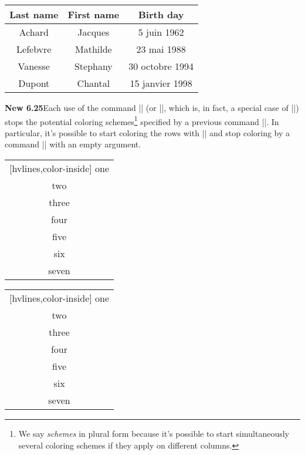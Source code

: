 \documentclass[dvipsnames]{article}%
\begin{document}
\begin{center}
\NewDocumentCommand { \Blue } { } {  }
\begin{NiceTabular}{>{\Blue}c>{\Blue}cc} 
\toprule
{}
Last name & First name & Birth day \\
\midrule
Achard  & Jacques & 5 juin 1962 \\
Lefebvre & Mathilde & 23 mai 1988 \\
Vanesse & Stephany & 30 octobre 1994 \\
Dupont & Chantal & 15 janvier 1998 \\
\bottomrule
\end{NiceTabular}
\end{center}

\bigskip
\colorbox{yellow!50}{\textbf{New 6.25}}\enskip Each use of the command
|\rowlistcolors| (or |\rowcolors|, which is, in fact, a special case of
|\rowlistcolors|) stops the potential coloring schemes\footnote{We say
  \emph{schemes} in plural form because it's possible to start simultaneously
  several coloring schemes if they apply on different columns.} specified by a
previous command |\rowlistcolors|. In particular, it's possible to start
coloring the rows with || and stop coloring by a command
|\rowlistcolors| with an empty argument.

\bigskip
\begin{Code}[width=10cm]
\begin{NiceTabular}{c}[hvlines,color-inside]
one \\
two \\
\emph{}
three \\
four \\
five \\
\emph{\rowlistcolors{}}
six \\
seven \\
\end{NiceTabular}
\end{Code}
\begin{NiceTabular}{c}[hvlines,color-inside]
one \\
two \\
three \\
four \\
five \\
\rowlistcolors{}
six \\
seven \\
\end{NiceTabular}
\end{document}
